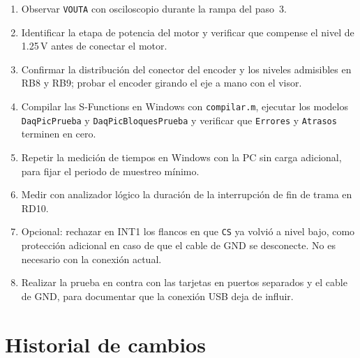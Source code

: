 \documentclass[11pt]{article}
\newcommand{\code}[1]{\texttt{#1}}
\begin{document}
\begin{enumerate}
\item Observar \code{VOUTA} con osciloscopio durante la rampa del paso~3.
\item Identificar la etapa de potencia del motor y verificar que compense el
  nivel de 1.25\,V antes de conectar el motor.
\item Confirmar la distribución del conector del encoder y los niveles
  admisibles en RB8 y RB9; probar el encoder girando el eje a mano con el
  visor.
\item Compilar las S-Functions en Windows con \code{compilar.m}, ejecutar
  los modelos \code{DaqPicPrueba} y \code{DaqPicBloquesPrueba} y verificar
  que \code{Errores} y \code{Atrasos} terminen en cero.
\item Repetir la medición de tiempos en Windows con la PC sin carga
  adicional, para fijar el periodo de muestreo mínimo.
\item Medir con analizador lógico la duración de la interrupción de fin de
  trama en RD10.
\item Opcional: rechazar en INT1 los flancos en que \code{CS} ya volvió a
  nivel bajo, como protección adicional en caso de que el cable de GND se
  desconecte. No es necesario con la conexión actual.
\item Realizar la prueba en contra con las tarjetas en puertos separados y
  el cable de GND, para documentar que la conexión USB deja de influir.
\end{enumerate}

\appendix
\section{Historial de cambios}
\end{document}
